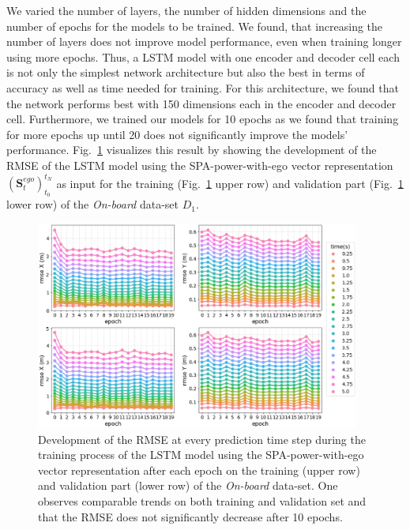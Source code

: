 We varied the number of layers, the number of hidden dimensions and the number of epochs for the models to be trained.
We found, that increasing the number of layers does not improve model performance, even when training longer using more epochs.
Thus, a \ac{LSTM} model with one encoder and decoder cell each is not only the simplest network architecture but also the best in terms of accuracy as well as time needed for training.
For this architecture, we found that the network performs best with \num{150} dimensions each in the encoder and decoder cell.
Furthermore, we trained our models for \num{10} epochs as we found that training for more epochs up until \num{20} does not significantly improve the models' performance.
Fig.~\ref{fig:rmse_dev_over_epochs} visualizes this result by showing the development of the \ac{RMSE} of the \ac{LSTM} model using the \ac{SPA}-power-with-ego vector representation $(\mathbf{S}_{t}^{ego})_{t_0}^{t_N}$ as input for the training (Fig.~\ref{fig:rmse_dev_over_epochs} upper row) and validation part (Fig.~\ref{fig:rmse_dev_over_epochs} lower row) of the \emph{On-board} data-set $D_1$.
\begin{figure}[t!]
  \centering
  \includegraphics[width=0.95\textwidth]{imgs/rmse_dev_over_epochs.eps}
  \caption{Development of the \ac{RMSE} at every prediction time step during the training process of the \ac{LSTM} model using the \ac{SPA}-power-with-ego vector representation after each epoch on the training (upper row) and validation part (lower row) of the \emph{On-board} data-set. One observes comparable trends on both training and validation set and that the \ac{RMSE} does not significantly decrease after \num{10} epochs.}\label{fig:rmse_dev_over_epochs}
\end{figure}


